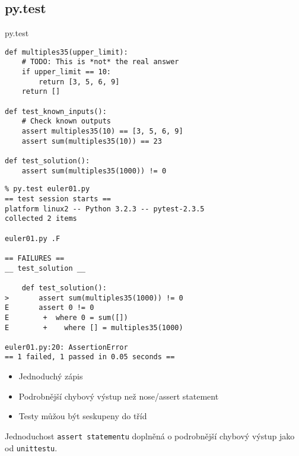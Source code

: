 \subsection{py.test}

\begin{frame}
\begin{center}
\huge{py.test}
\end{center}
\end{frame}

\begin{frame}[fragile]
\begin{verbatim}
def multiples35(upper_limit):
    # TODO: This is *not* the real answer
    if upper_limit == 10:
        return [3, 5, 6, 9]
    return []

def test_known_inputs():
    # Check known outputs
    assert multiples35(10) == [3, 5, 6, 9]
    assert sum(multiples35(10)) == 23

def test_solution():
    assert sum(multiples35(1000)) != 0
\end{verbatim}
\end{frame}

\begin{frame}[fragile]
\begin{verbatim}
% py.test euler01.py
== test session starts ==
platform linux2 -- Python 3.2.3 -- pytest-2.3.5
collected 2 items 

euler01.py .F

== FAILURES ==
__ test_solution __

    def test_solution():
>       assert sum(multiples35(1000)) != 0
E       assert 0 != 0
E        +  where 0 = sum([])
E        +    where [] = multiples35(1000)

euler01.py:20: AssertionError
== 1 failed, 1 passed in 0.05 seconds ==

\end{verbatim}
\end{frame}

\begin{frame}
\begin{itemize}[<+->]
\item Jednoduchý zápis
\item Podrobnější chybový výstup než nose/assert statement
\item Testy můžou být seskupeny do tříd
\end{itemize}
\end{frame}

\begin{frame}
\begin{block}{}
    Jednoduchost {\tt assert statementu} doplněná o podrobnější chybový výstup jako od {\tt unittestu}.
\end{block}
\end{frame}